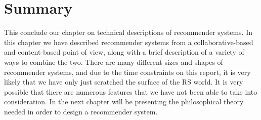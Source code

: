 \section{Summary}

This conclude our chapter on technical descriptions of recommender systems. In this chapter we have described recommender systems from a collaborative-based and content-based point of view, along with a brief description of a variety of ways to combine the two. There are many different sizes and shapes of recommender systems, and due to the time constraints on this report, it is very likely that we have only just scratched the surface of the RS world. It is very possible that there are numerous features that we have not been able to take into consideration.
In the next chapter will be presenting the philosophical theory needed in order to design a recommender system.

